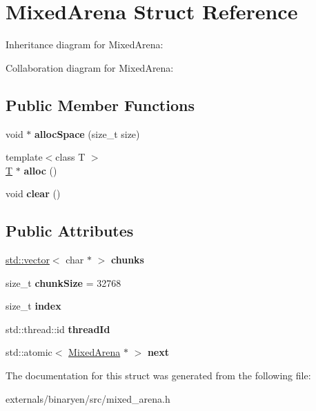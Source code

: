 \hypertarget{struct_mixed_arena}{}\section{Mixed\+Arena Struct Reference}
\label{struct_mixed_arena}


Inheritance diagram for Mixed\+Arena\+:


Collaboration diagram for Mixed\+Arena\+:
\subsection*{Public Member Functions}
\begin{DoxyCompactItemize}
\item 
\mbox{\label{struct_mixed_arena_a47027c560ef6da8d252da84c95847716}} 
void $\ast$ {\bfseries alloc\+Space} (size\+\_\+t size)
\item 
\mbox{\label{struct_mixed_arena_a8620fbe4e9d15ab6674e15bb4e18bc1d}} 
{\footnotesize template$<$class T $>$ }\\\mbox{\hyperlink{struct_t}{T}} $\ast$ {\bfseries alloc} ()
\item 
\mbox{\label{struct_mixed_arena_acb20f019c4536779ab3841065ef270ed}} 
void {\bfseries clear} ()
\end{DoxyCompactItemize}
\subsection*{Public Attributes}
\begin{DoxyCompactItemize}
\item 
\mbox{\label{struct_mixed_arena_a07e88604ea4c98925742f09e5f0d78b2}} 
\mbox{\hyperlink{classstd_1_1vector}{std\+::vector}}$<$ char $\ast$ $>$ {\bfseries chunks}
\item 
\mbox{\label{struct_mixed_arena_a6dc7fdbda4d6e59678c2225f8110de1e}} 
size\+\_\+t {\bfseries chunk\+Size} = 32768
\item 
\mbox{\label{struct_mixed_arena_a19a67553935f474ef0a66f015059e0da}} 
size\+\_\+t {\bfseries index}
\item 
\mbox{\label{struct_mixed_arena_a8ac33dd75bc5ea2daf8a121434a02793}} 
std\+::thread\+::id {\bfseries thread\+Id}
\item 
\mbox{\label{struct_mixed_arena_a75fb05ab3bd5dc63662ed3e16804256d}} 
std\+::atomic$<$ \mbox{\hyperlink{struct_mixed_arena}{Mixed\+Arena}} $\ast$ $>$ {\bfseries next}
\end{DoxyCompactItemize}


The documentation for this struct was generated from the following file\+:\begin{DoxyCompactItemize}
\item 
externals/binaryen/src/mixed\+\_\+arena.\+h\end{DoxyCompactItemize}
